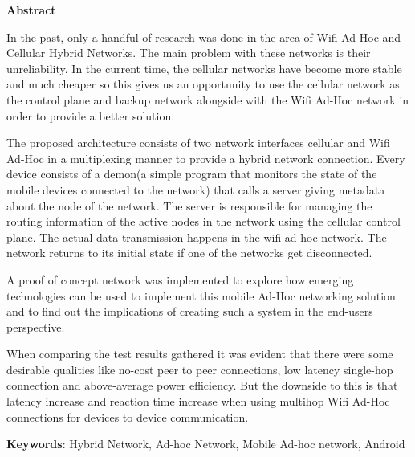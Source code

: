 \begin{center}
\textbf{\Large{Abstract}}
\end{center}
\vspace{0.7cm}


 
\vspace{12pt}


In the past, only a handful of research was done in the area of Wifi Ad-Hoc and Cellular Hybrid Networks. The main problem with these networks is their unreliability. In the current time, the cellular networks have become more stable and much cheaper so this gives us an opportunity to use the cellular network as the control plane and backup network alongside with the Wifi Ad-Hoc network in order to provide a better solution.

\vspace{12pt}

 The proposed architecture consists of two network interfaces cellular and Wifi Ad-Hoc in a multiplexing manner to provide a hybrid network connection. Every device consists of a demon(a simple program that monitors the state of the mobile devices connected to the network) that calls a server giving metadata about the node of the network. The server is responsible for managing the routing information of the active nodes in the network using the cellular control plane. The actual data transmission happens in the wifi ad-hoc network. The network returns to its initial state if one of the networks get disconnected. 
 
\vspace{12pt}
 
 A proof of concept network was implemented to explore how emerging technologies can be used to implement this mobile Ad-Hoc networking solution and to find out the implications of creating such a system in the end-users perspective.

\vspace{12pt}

 When comparing the test results gathered it was evident that there were some desirable qualities like no-cost peer to peer connections, low latency single-hop connection and above-average power efficiency. But the downside to this is that latency increase and reaction time increase when using multihop Wifi Ad-Hoc connections for devices to device communication.


\vspace{0.7cm}




\textbf{Keywords}: Hybrid Network, Ad-hoc Network, Mobile Ad-hoc network, Android 
